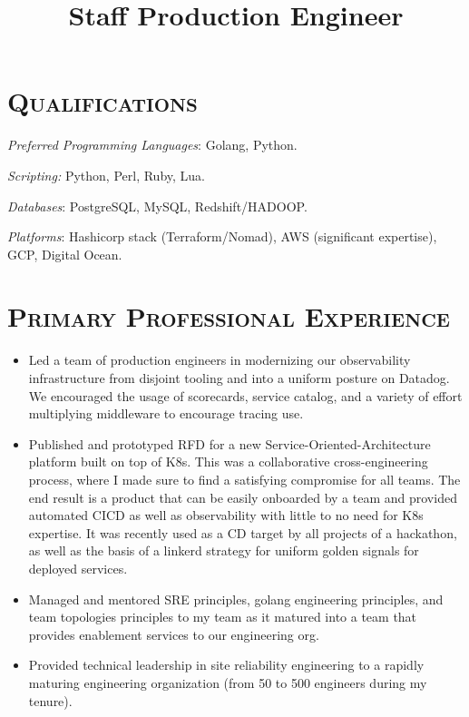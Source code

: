 \begin{resume}
\section{\textsc{Qualifications}}

\emph{Preferred Programming Languages}: Golang, Python.

\emph{Scripting:} Python, Perl, Ruby, Lua.

\emph{Databases}: PostgreSQL, MySQL, Redshift/HADOOP.

\emph{Platforms}: Hashicorp stack (Terraform/Nomad), AWS (significant expertise), GCP, Digital Ocean.

\section{\textsc{Primary Professional Experience}}


\title{Staff Production Engineer}
\begin{position}
\begin{itemize}
\item Led a team of production engineers in modernizing our observability infrastructure from disjoint tooling and into a uniform posture on Datadog. We encouraged the usage of scorecards, service catalog, and a variety of effort multiplying middleware to encourage tracing use.
\item Published and prototyped RFD for a new Service-Oriented-Architecture platform built on top of K8s. This was a collaborative cross-engineering process, where I made sure to find a satisfying compromise for all teams. The end result is a product that can be easily onboarded by a team and provided automated CICD as well as observability with little to no need for K8s expertise. It was recently used as a CD target by all projects of a hackathon, as well as the basis of a linkerd strategy for uniform golden signals for deployed services.
\item Managed and mentored SRE principles, golang engineering principles, and team topologies principles to my team as it matured into a team that provides enablement services to our engineering org.
\item Provided technical leadership in site reliability engineering to a rapidly maturing engineering organization (from 50 to 500 engineers during my tenure).
\end{itemize}
\end{position}


\end{resume}
